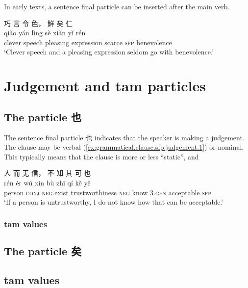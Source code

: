 \documentclass[UTF8, a4paper, oneside, scheme=plain, 12pt]{ctexrep}
\newcommand{\translate}[1]{`#1'}
\newcommand*{\category}[1]{\textsc{#1}}
\begin{document}
In early texts, a sentence final particle can be inserted after the main verb.

\begin{exe}
    \ex
    \glll 巧 言 令 色， 鲜 矣 仁 \\
    qiǎo yán lìng sè xiǎn yǐ rén \\
    clever speech pleasing expression scarce \category{sfp} benevolence \\
    \glt\translate{Clever speech and a pleasing expression seldom go with benevolence.}
\end{exe}

\section{Judgement and \ac{tam} particles}\label{sec:sfp.judgement}

\subsection{The particle 也}

The sentence final particle 也 indicates that the speaker is making a judgement. 
The clause may be verbal (\ref{ex:grammatical.clause.sfp.judgement.1}) or nominal.
This typically means that the clause is more or less ``static'', and 

\begin{exe}
    \ex\label{ex:grammatical.clause.sfp.judgement.1}
    \glll 人 而 无 信， 不 知 其 可 也 \\
    rén ér wú xìn bù zhī qí kě yě \\
    person \category{conj} \category{neg}.exist trustworthiness \category{neg} know 3.\category{gen} acceptable \category{sfp} \\
    \glt\translate{If a person is untrustworthy, I do not know how that can be acceptable.}


\end{exe}

\subsubsection{\ac{tam} values}



\subsection{The particle 矣}

\subsection{\ac{tam} values}\label{sec:sfp.yi.not-tense}
\end{document}
